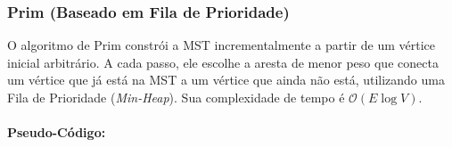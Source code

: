 
\subsubsection{Prim (Baseado em Fila de Prioridade)}
O algoritmo de Prim constrói a MST incrementalmente a partir de um vértice
inicial arbitrário. A cada passo, ele escolhe a aresta de menor peso que
conecta um vértice que já está na MST a um vértice que ainda não está,
utilizando uma Fila de Prioridade (\textit{Min-Heap}). Sua complexidade de
tempo é $\mathcal{O}(E \log V)$.

\paragraph{Pseudo-Código: }\mbox{}\\
\begin{algorithm}[H]
    \SetAlgoLined

    \caption{Algoritmo de Prim}
\end{algorithm}

